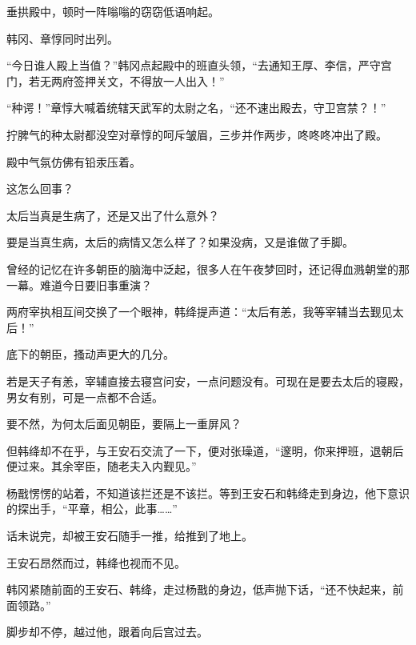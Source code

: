 垂拱殿中，顿时一阵嗡嗡的窃窃低语响起。

韩冈、章惇同时出列。

“今日谁人殿上当值？”韩冈点起殿中的班直头领，“去通知王厚、李信，严守宫门，若无两府签押关文，不得放一人出入！”

“种谔！”章惇大喊着统辖天武军的太尉之名，“还不速出殿去，守卫宫禁？！”

拧脾气的种太尉都没空对章惇的呵斥皱眉，三步并作两步，咚咚咚冲出了殿。

殿中气氛仿佛有铅汞压着。

这怎么回事？

太后当真是生病了，还是又出了什么意外？

要是当真生病，太后的病情又怎么样了？如果没病，又是谁做了手脚。

曾经的记忆在许多朝臣的脑海中泛起，很多人在午夜梦回时，还记得血溅朝堂的那一幕。难道今日要旧事重演？

两府宰执相互间交换了一个眼神，韩绛提声道：“太后有恙，我等宰辅当去觐见太后！”

底下的朝臣，搔动声更大的几分。

若是天子有恙，宰辅直接去寝宫问安，一点问题没有。可现在是要去太后的寝殿，男女有别，可是一点都不合适。

要不然，为何太后面见朝臣，要隔上一重屏风？

但韩绛却不在乎，与王安石交流了一下，便对张璪道，“邃明，你来押班，退朝后便过来。其余宰臣，随老夫入内觐见。”

杨戬愣愣的站着，不知道该拦还是不该拦。等到王安石和韩绛走到身边，他下意识的探出手，“平章，相公，此事……”

话未说完，却被王安石随手一推，给推到了地上。

王安石昂然而过，韩绛也视而不见。

韩冈紧随前面的王安石、韩绛，走过杨戬的身边，低声抛下话，“还不快起来，前面领路。”

脚步却不停，越过他，跟着向后宫过去。
